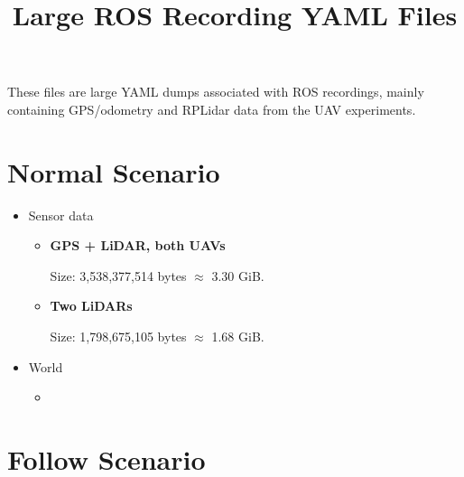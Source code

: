 \documentclass[a4paper]{article}
\title{Large ROS Recording YAML Files}
\date{}
\begin{document}
   \maketitle

   These files are large YAML dumps associated with ROS recordings, mainly containing GPS/odometry and RPLidar data from the UAV experiments.

   \section{Normal Scenario}

      \begin{itemize}
         \item Sensor data
         \begin{itemize}
            \item \textbf{GPS + LiDAR, both UAVs}

            \texttt{}

            Size: 3,538,377,514 bytes $\approx$ 3.30 GiB.

            \item \textbf{Two LiDARs}

            \texttt{}

            Size: 1,798,675,105 bytes $\approx$ 1.68 GiB.
         \end{itemize}
         \item World
         \begin{itemize}
            \item
         \end{itemize}


      \end{itemize}

   \section{Follow Scenario}
\end{document}
